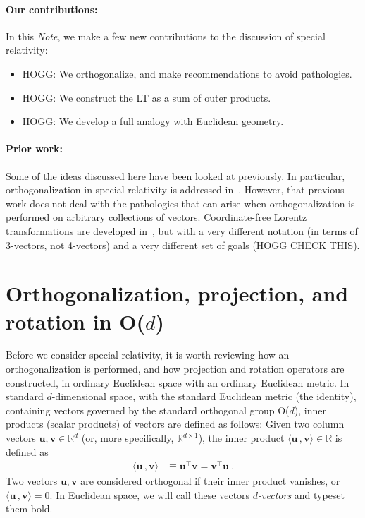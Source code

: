 \documentclass{article}
\newcommand{\Evec}[1]{{\mathbf{#1}}} %
\newcommand{\inner}[2]{\langle{#1}\,,{#2}\rangle}
\newcommand{\documentname}{\textsl{Note}}
\begin{document}
\paragraph{Our contributions:}
In this \documentname, we make a few new contributions to the discussion of special relativity:
\begin{itemize}
\item
HOGG: We orthogonalize, and make recommendations to avoid pathologies.
\item
HOGG: We construct the LT as a sum of outer products.
\item
HOGG: We develop a full analogy with Euclidean geometry.
\end{itemize}

\paragraph{Prior work:}
Some of the ideas discussed here have been looked at previously.
In particular, orthogonalization in special relativity is addressed in~\cite{joot}.
However, that previous work does not deal with the pathologies that can arise when orthogonalization is performed on arbitrary collections of vectors.
Coordinate-free Lorentz transformations are developed in~\cite{wagner}, but with a very different notation (in terms of 3-vectors, not 4-vectors) and a very different set of goals (HOGG CHECK THIS).

\section{Orthogonalization, projection, and rotation in O($d$)}\label{sec:od}

Before we consider special relativity, it is worth reviewing how an orthogonalization is performed, and how projection and rotation operators are constructed, in ordinary Euclidean space with an ordinary Euclidean metric.
In standard $d$-dimensional space, with the standard Euclidean metric (the identity), containing vectors governed by the standard orthogonal group O($d$), inner products (scalar products) of vectors are defined as follows:
Given two column vectors $\Evec{u},\Evec{v}\in\mathbb{R}^d$ (or, more specifically, $\mathbb{R}^{d\times1}$), the inner product $\inner{\Evec{u}}{\Evec{v}}\in\mathbb{R}$ is defined as
\begin{align}
    \inner{\Evec{u}}{\Evec{v}} &\equiv \Evec{u}^\top \Evec{v} = \Evec{v}^\top \Evec{u} ~.
\end{align}
Two vectors $\Evec{u},\Evec{v}$ are considered orthogonal if their inner product vanishes, or $\inner{\Evec{u}}{\Evec{v}}=0$.
In Euclidean space, we will call these vectors \emph{$d$-vectors} and typeset them bold.
\end{document}
